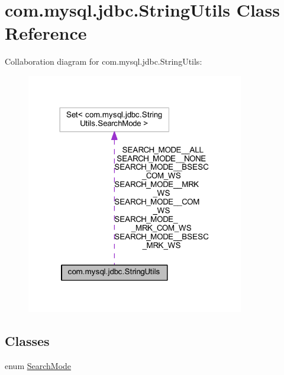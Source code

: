 \hypertarget{classcom_1_1mysql_1_1jdbc_1_1_string_utils}{}\section{com.\+mysql.\+jdbc.\+String\+Utils Class Reference}
\label{classcom_1_1mysql_1_1jdbc_1_1_string_utils}


Collaboration diagram for com.\+mysql.\+jdbc.\+String\+Utils\+:
\nopagebreak
\begin{figure}[H]
\begin{center}
\leavevmode
\includegraphics[width=269pt]{classcom_1_1mysql_1_1jdbc_1_1_string_utils__coll__graph}
\end{center}
\end{figure}
\subsection*{Classes}
\begin{DoxyCompactItemize}
\item 
enum \mbox{\hyperlink{enumcom_1_1mysql_1_1jdbc_1_1_string_utils_1_1_search_mode}{Search\+Mode}}
\end{DoxyCompactItemize}
